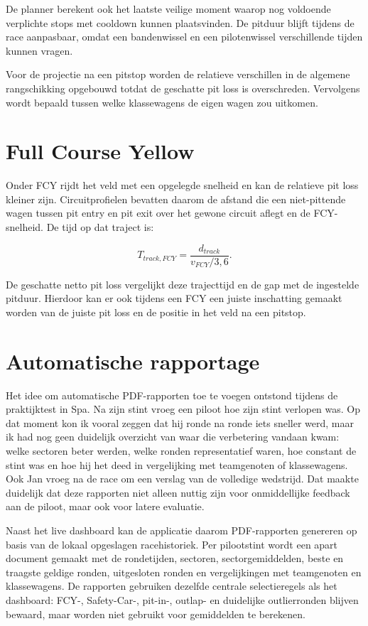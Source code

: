 De planner berekent ook het laatste veilige moment waarop nog voldoende verplichte stops met
cooldown kunnen plaatsvinden. De pitduur blijft tijdens de race aanpasbaar,
omdat een bandenwissel en een pilotenwissel verschillende tijden kunnen vragen.

Voor de projectie na een pitstop worden de relatieve verschillen in de algemene rangschikking
opgebouwd totdat de geschatte pit loss is overschreden. Vervolgens wordt bepaald tussen welke
klassewagens de eigen wagen zou uitkomen.

\section{Full Course Yellow}
Onder FCY rijdt het veld met een opgelegde snelheid en kan de relatieve pit loss kleiner zijn.
Circuitprofielen bevatten daarom de afstand die een niet-pittende wagen tussen pit entry en pit exit
over het gewone circuit aflegt en de FCY-snelheid. De tijd op dat traject is:

\[ T_{track,FCY} = \frac{d_{track}}{v_{FCY}/3{,}6}. \]

De geschatte netto pit loss vergelijkt deze trajecttijd en de gap met de ingestelde pitduur. Hierdoor kan er ook tijdens een FCY een juiste inschatting gemaakt worden van de juiste pit loss en de positie in het veld na een pitstop. 

\section{Automatische rapportage}
Het idee om automatische PDF-rapporten toe te voegen ontstond tijdens de praktijktest in Spa. Na
zijn stint vroeg een piloot hoe zijn stint verlopen was. Op dat moment kon ik vooral zeggen dat hij
ronde na ronde iets sneller werd, maar ik had nog geen duidelijk overzicht van waar die verbetering
vandaan kwam: welke sectoren beter werden, welke ronden representatief waren, hoe constant de stint
was en hoe hij het deed in vergelijking met teamgenoten of klassewagens. Ook Jan vroeg na de race om een
verslag van de volledige wedstrijd. Dat maakte duidelijk dat deze rapporten niet alleen nuttig zijn
voor onmiddellijke feedback aan de piloot, maar ook voor latere evaluatie.

Naast het live dashboard kan de applicatie daarom PDF-rapporten genereren op basis van de lokaal
opgeslagen racehistoriek. Per pilootstint wordt een apart document gemaakt met de rondetijden,
sectoren, sectorgemiddelden, beste en traagste geldige ronden, uitgesloten ronden en vergelijkingen met teamgenoten en klassewagens. De rapporten gebruiken
dezelfde centrale selectieregels als het dashboard: FCY-, Safety-Car-, pit-in-, outlap- en
duidelijke outlierronden blijven bewaard, maar worden niet gebruikt voor gemiddelden te berekenen.

